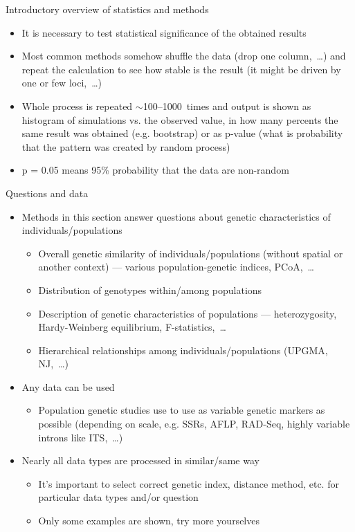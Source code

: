 \documentclass[compress, xelatex, 11pt, xcolor=svgnames, aspectratio=169,
	hyperref={
		bookmarks=true,
		unicode=true,
		colorlinks=true,
		pdftitle={Molecular data in R},
		plainpages=false,
		pdfauthor={Vojtech Zeisek},
		pdfsubject={Course about phylogeny and evolution in R},
		pdfcreator={XeLaTeX},
		pdfkeywords={R, evolution, phylogeny, molecular data},
		linkcolor=Crimson, %
		anchorcolor=Magenta, %
		citecolor=Magenta, %
		filecolor=Magenta, %
		menucolor=Magenta, %
		urlcolor=DodgerBlue, %
		},
	url={hyphens, lowtilde} %
	]{beamer}
\begin{document}
\begin{frame}[allowframebreaks]{Introductory overview of statistics and methods}
\begin{itemize}
		\begin{itemize}
			\item It is necessary to test statistical significance of the obtained results
			\item Most common methods somehow shuffle the data (drop one column,~\ldots) and repeat the calculation to see how stable is the result (it might be driven by one or few loci,~\ldots)
			\item Whole process is repeated $\sim$100--1000~times and output is shown as histogram of simulations vs. the observed value, in how many percents the same result was obtained (e.g. bootstrap) or as p-value (what is probability that the pattern was created by random process)
			\item p = 0.05 means 95\% probability that the data are non-random
		\end{itemize}
	\end{itemize}
\end{frame}

\begin{frame}{Questions and data}
	\begin{itemize}
		\item Methods in this section answer questions about genetic characteristics of individuals/populations
		\begin{itemize}
			\item Overall genetic similarity of individuals/populations (without spatial or another context) --- various population-genetic indices, PCoA,~\ldots
			\item Distribution of genotypes within/among populations
			\item Description of genetic characteristics of populations --- heterozygosity, Hardy-Weinberg equilibrium, F-statistics,~\ldots
			\item Hierarchical relationships among individuals/populations (UPGMA, NJ,~\ldots)
		\end{itemize}
		\item Any data can be used
		\begin{itemize}
			\item Population genetic studies use to use as variable genetic markers as possible (depending on scale, e.g. SSRs, AFLP, RAD-Seq, highly variable introns like ITS,~\ldots)
		\end{itemize}
		\item Nearly all data types are processed in similar/same way
		\begin{itemize}
			\item It's important to select correct genetic index, distance method, etc. for particular data types and/or question
			\item Only some examples are shown, try more yourselves
		\end{itemize}
	\end{itemize}
\end{frame}
\end{document}
